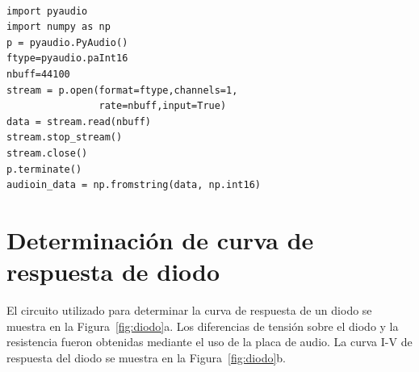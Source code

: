 \documentclass[a4paper,10pt]{article}
\begin{document}
\lstset{language=Python}
\begin{lstlisting}[frame=single]  % Start your code-block

import pyaudio
import numpy as np
p = pyaudio.PyAudio()
ftype=pyaudio.paInt16
nbuff=44100
stream = p.open(format=ftype,channels=1,
                rate=nbuff,input=True)
data = stream.read(nbuff)
stream.stop_stream()
stream.close()
p.terminate()
audioin_data = np.fromstring(data, np.int16)
\end{lstlisting}
% 
% 

\section{Determinación de curva de respuesta de diodo}
\label{sec:diodo}

El circuito utilizado para determinar la curva de respuesta de
un diodo se muestra en la Figura~\ref{fig:diodo}a. Los diferencias
de tensión sobre el diodo y la resistencia fueron obtenidas
mediante el uso de la placa de audio. La curva I-V de respuesta
del diodo se muestra en la Figura~\ref{fig:diodo}b.
\end{document}
